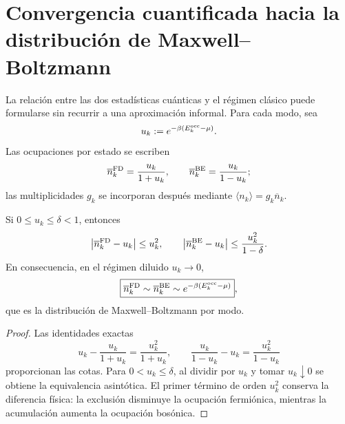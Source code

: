 \clearpage
\section{Convergencia cuantificada hacia la distribución de Maxwell--Boltzmann}
\label{v:v:rec:ocupacion:section:03}

La relación entre las dos estadísticas cuánticas y el régimen clásico puede
formularse sin recurrir a una aproximación informal. Para cada modo, sea
\[
 u_k:=e^{-\beta(E_k^{\rm occ}-\mu)}.
\]
Las ocupaciones por estado se escriben
\[
 \overline n_k^{\rm FD}=\frac{u_k}{1+u_k},
 \qquad
 \overline n_k^{\rm BE}=\frac{u_k}{1-u_k};
\]
las multiplicidades \(g_k\) se incorporan después mediante
\(\langle n_k\rangle=g_k\overline n_k\).

\begin{theorem}
\label{v:v:rec:thm:limite-clasico-fd-be-rev2}
Si \(0\leq u_k\leq\delta<1\), entonces
\[
 \left|\overline n_k^{\rm FD}-u_k\right|\leq u_k^2,
 \qquad
 \left|\overline n_k^{\rm BE}-u_k\right|
 \leq\frac{u_k^2}{1-\delta}.
\]
En consecuencia, en el régimen diluido \(u_k\to0\),
\[
 \boxed{
 \overline n_k^{\rm FD}\sim
 \overline n_k^{\rm BE}\sim
 e^{-\beta(E_k^{\rm occ}-\mu)}} ,
\]
que es la distribución de Maxwell--Boltzmann por modo.
\end{theorem}

\begin{proof}
Las identidades exactas
\[
 u_k-\frac{u_k}{1+u_k}=\frac{u_k^2}{1+u_k},
 \qquad
 \frac{u_k}{1-u_k}-u_k=\frac{u_k^2}{1-u_k}
\]
proporcionan las cotas. Para \(0<u_k\leq\delta\), al dividir por \(u_k\) y
tomar \(u_k\downarrow0\) se obtiene
la equivalencia asintótica. El primer término de orden \(u_k^2\) conserva la
diferencia física: la exclusión disminuye la ocupación fermiónica, mientras
la acumulación aumenta la ocupación bosónica.
\end{proof}
